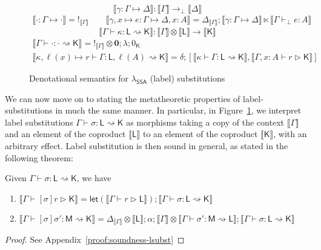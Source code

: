 \documentclass[acmsmall,screen,review]{acmart}
\newcommand{\mb}[1]{\ensuremath{\mathbf{#1}}}
\newcommand{\ms}[1]{\ensuremath{\mathsf{#1}}}
\newcommand{\bhyp}[2]{#1 : #2}
\newcommand{\hasty}[4]{#1 \vdash_{#2} #3: {#4}}
\newcommand{\haslb}[3]{#1 \vdash #2 \rhd #3}
\newcommand{\issubst}[3]{#1: #2 \mapsto #3}
\newcommand{\lbsubst}[4]{#1 \vdash #2: #3 \rightsquigarrow #4}
\newcommand{\dnt}[1]{\llbracket{#1}\rrbracket}
\newcommand{\tmor}[1]{{!}_{#1}}
\newcommand{\dmor}[1]{{\Delta}_{#1}}
\newcommand{\lmor}[1]{\ms{let}(#1)}
\newcommand{\isotopessa}{\(\lambda_{\ms{SSA}}\)}
\begin{document}
\begin{figure}
  \begin{equation*}
    \boxed{\dnt{\issubst{\gamma}{\Gamma}{\Delta}} 
      : \dnt{\Gamma} \to_\bot \dnt{\Delta}}
  \end{equation*}
  \begin{gather*}
    \dnt{\issubst{\cdot}{\Gamma}{\cdot}} = \tmor{\dnt{\Gamma}}
    \qquad
    \dnt{\issubst{\gamma, x \mapsto e}{\Gamma}{\Delta, \bhyp{x}{A}}}
    = \dmor{\dnt{\Gamma}};\dnt{\issubst{\gamma}{\Gamma}{\Delta}} 
      \ltimes \dnt{\hasty{\Gamma}{\bot}{e}{A}}
  \end{gather*}
  \begin{equation*}
    \boxed{\dnt{\lbsubst{\Gamma}{\kappa}{\ms{L}}{\ms{K}}} 
      : \dnt{\Gamma} \otimes \dnt{\ms{L}} \to \dnt{\ms{K}}}
  \end{equation*}
  \begin{gather*}
    \dnt{\lbsubst{\Gamma}{\cdot}{\cdot}{\ms{K}}} 
      = \tmor{\dnt{\Gamma}} \otimes \mb{0}; \lambda; 0_{\ms{K}}
    \\
    \dnt{\lbsubst{\kappa, \ell(x) \mapsto r}{\Gamma}{\ms{L}, \ell(A)}{\ms{K}}}
      = \delta ; [
      \dnt{\lbsubst{\kappa}{\Gamma}{\ms{L}}{\ms{K}}}, 
      \dnt{\haslb{\Gamma, \bhyp{x}{A}}{r}{\ms{K}}}
    ]
  \end{gather*}
  \caption{Denotational semantics for \isotopessa{} (label) substitutions}
  \Description{}
  \label{fig:ssa-subst-sem} 
\end{figure}

We can now move on to stating the metatheoretic properties of label-substitutions in much the same
manner. In particular, in Figure~\ref{fig:ssa-subst-sem}, we interpret label substitutions
$\lbsubst{\Gamma}{\sigma}{\ms{L}}{\ms{K}}$ as morphisms taking a copy of the context $\dnt{\Gamma}$
and an element of the coproduct $\dnt{\ms{L}}$ to an element of the coproduct $\dnt{\ms{K}}$, with
an arbitrary effect. Label substitution is then sound in general, as stated in the following
theorem:
\begin{theorem}[name=Soundness (Label Substitution), restate=soundnesslsubst]
  Given $\lbsubst{\Gamma}{\sigma}{\ms{L}}{\ms{K}}$, we have
  \begin{enumerate}[label=(\alph*)]
    \item $\dnt{\haslb{\Gamma}{[\sigma]r}{\ms{K}}}
      = \lmor{\dnt{\haslb{\Gamma}{r}{\ms{L}}}}
      ; \dnt{\lbsubst{\Gamma}{\sigma}{\ms{L}}{\ms{K}}}$
    \item $\dnt{\lbsubst{\Gamma}{[\sigma]\sigma'}{\ms{M}}{\ms{K}}}
      = \dmor{\dnt{\Gamma}} \otimes \dnt{\ms{L}} ; \alpha
      ; \dnt{\Gamma} \otimes \dnt{\lbsubst{\Gamma}{\sigma'}{\ms{M}}{\ms{L}}}
      ; \dnt{\lbsubst{\Gamma}{\sigma}{\ms{L}}{\ms{K}}}$
  \end{enumerate}
\end{theorem}
\begin{proof}
  See Appendix~\ref{proof:soundness-lsubst}
\end{proof}
\end{document}
